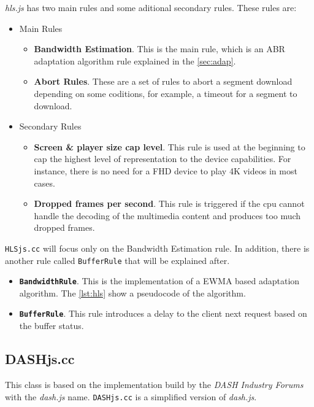 \textit{hls.js} has two main rules and some aditional secondary rules. These rules are:
\begin{itemize}[noitemsep, topsep=0pt]
  \item Main Rules
  \begin{itemize}[noitemsep, topsep=0pt]
    \item \textbf{Bandwidth Estimation}. This is the main rule, which is an ABR adaptation
    algorithm rule explained in the \autoref{sec:adap}.
    \item \textbf{Abort Rules}. These are a set of rules to abort a segment download depending on
    some coditions, for example, a timeout for a segment to download.
  \end{itemize}
  \item Secondary Rules
  \begin{itemize}[noitemsep, topsep=0pt]
    \item \textbf{Screen \& player size cap level}. This rule is used at the beginning to cap the highest
    level of representation to the device capabilities. For instance, there is no need for a FHD
    device to play 4K videos in most cases.
    \item \textbf{Dropped frames per second}. This rule is triggered if the cpu cannot handle the 
    decoding of the multimedia content and produces too much dropped frames.
  \end{itemize}
\end{itemize}

\texttt{HLSjs.cc} will focus only on the Bandwidth Estimation rule. In addition, there is another 
rule called \texttt{BufferRule} that will be explained after.

\begin{itemize}
  \item \textbf{\texttt{BandwidthRule}}. This is the implementation of a EWMA based adaptation
  algorithm. The \autoref{lst:hls} show a pseudocode of the algorithm.
  \item \textbf{\texttt{BufferRule}}. This rule introduces a delay to the client
  next request based on the buffer status.
\end{itemize}

\subsection{DASHjs.cc}
This class is based on the implementation build by the \textit{DASH Industry Forums} with the \textit{dash.js}
name. \texttt{DASHjs.cc} is a simplified version of \textit{dash.js}.

